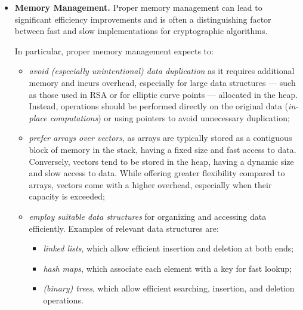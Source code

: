 \begin{itemize}
	\item \textbf{Memory Management.} Proper memory management can lead to significant efficiency improvements and is often a distinguishing factor between fast and slow implementations for cryptographic algorithms.
	
	
	In particular, proper memory management expects to:
	
	\begin{itemize} 
		
		\item \textit{avoid (especially unintentional) data duplication} as it requires additional memory and incurs overhead, especially for large data structures --- such as those used in RSA or for elliptic curve points --- allocated in the heap. Instead, operations should be performed directly on the original data (\textit{in-place computations}) or using pointers to avoid unnecessary duplication;
		
		\item \textit{prefer arrays over vectors}, as arrays are typically stored as a contiguous block of memory in the stack, having a fixed size and fast access to data. Conversely, vectors tend to be stored in the heap, having a dynamic size and slow access to data. While offering greater flexibility compared to arrays, vectors come with a higher overhead, especially when their capacity is exceeded;
		
		\item \textit{employ suitable data structures} for organizing and accessing data efficiently. Examples of relevant data structures are:
		
		\begin{itemize} 
			
			\item \textit{linked lists}, which allow efficient insertion and deletion at both ends;
			
			\item \textit{hash maps}, which associate each element with a key for fast lookup;
			
			\item \textit{(binary) trees}, which allow efficient searching, insertion, and deletion operations.
			

\end{itemize}
\end{itemize}
\end{itemize}
